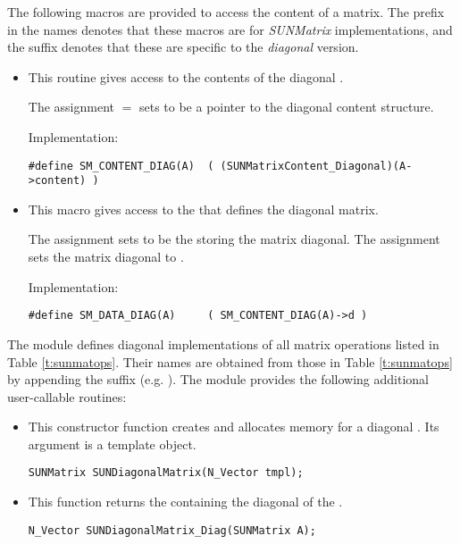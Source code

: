 \noindent The following macros are provided to access the
content of a {\sunmatdiag} matrix. The prefix  in the names
denotes that these macros are for \emph{SUNMatrix} implementations,
and the suffix  denotes that these are specific to
the \emph{diagonal} version.
\begin{itemize}

\item {}
    
  This routine gives access to the contents of the
  diagonal .
  
  The assignment  $=$  sets
   to be a pointer to the diagonal  content
  structure.                                             
                                                            
  Implementation: 
  
  \verb|#define SM_CONTENT_DIAG(A)  ( (SUNMatrixContent_Diagonal)(A->content) )|
  
\item {}
                                                            
  This macro gives access to the {\nvector}  that defines the
  diagonal matrix.

  The assignment  sets  to be     
  the {\nvector} storing the matrix diagonal.  The
  assignment  sets the {\nvector}
  matrix diagonal to .
  
  Implementation:

  \verb|#define SM_DATA_DIAG(A)     ( SM_CONTENT_DIAG(A)->d )|

\end{itemize}
The {\sunmatdiag} module defines diagonal implementations of all
matrix operations listed in Table \ref{t:sunmatops}. Their names are
obtained from those in Table \ref{t:sunmatops} by appending the
suffix  (e.g. ). 
The module {\sunmatdiag} provides the following additional
user-callable routines: 
\begin{itemize}


\item {}

  This constructor function creates and allocates memory for a diagonal .
  Its argument is a template {\nvector} object.

  \verb|SUNMatrix SUNDiagonalMatrix(N_Vector tmpl);|


\item {}

  This function returns the {\nvector} containing the diagonal of
  the . 
 
  \verb|N_Vector SUNDiagonalMatrix_Diag(SUNMatrix A);|

\end{itemize}
